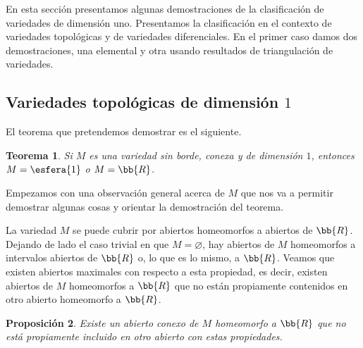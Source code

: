 \theoremstyle{plain}
\newtheorem{teoClasTop}{Teorema}[subsection]
\newtheorem{propoExisteUnAbiertoMaximalmenteHomeo}[teoClasTop]{Proposici\'{o}n}
\newtheorem{propoALoSumoDosComponentes}[teoClasTop]{Proposici\'{o}n}
\newtheorem{lemaEsSubintervaloExterno}[teoClasTop]{Lema}
\newtheorem{propoExtenderHomeoConIntervalo}[teoClasTop]{Proposici\'{o}n}
\newtheorem{teoClasTopConBorde}[teoClasTop]{Teorema}

\theoremstyle{remark}



En esta secci\'{o}n presentamos algunas demostraciones de la clasificaci\'{o}n
de variedades de dimensi\'{o}n uno. Presentamos la clasificaci\'{o}n
en el contexto de variedades topol\'{o}gicas y de variedades diferenciales.
En el primer caso damos dos demostraciones, una elemental y otra usando
resultados de triangulaci\'{o}n de variedades.

\subsection{Variedades topol\'{o}gicas de dimensi\'{o}n $1$}
El teorema que pretendemos demostrar es el siguiente.

\begin{teoClasTop}\label{thm:clastop}
	Si $M$ es una variedad sin borde, conexa y de dimensi\'{o}n $1$,
	entonces $M=\esfera{1}$ o $M=\bb{R}$.
\end{teoClasTop}

Empezamos con una observaci\'{o}n general acerca de $M$ que nos va a
permitir demostrar algunas cosas y orientar la demostraci\'{o}n del
teorema.

La variedad $M$ se puede cubrir por abiertos homeomorfos a abiertos de
$\bb{R}$. Dejando de lado el caso trivial en que $M=\varnothing$,
hay abiertos de $M$ homeomorfos a intervalos abiertos de $\bb{R}$ o,
lo que es lo mismo, a $\bb{R}$. Veamos que existen abiertos maximales con
respecto a esta propiedad, es decir, existen abiertos de $M$ homeomorfos
a $\bb{R}$ que no est\'{a}n propiamente contenidos en otro abierto homeomorfo
a $\bb{R}$.

\begin{propoExisteUnAbiertoMaximalmenteHomeo}%
	\label{thm:existeunabiertomaximalmentehomeo}
	Existe un abierto conexo de $M$ homeomorfo a $\bb{R}$ que
	no est\'{a} propiamente incluido en otro abierto con estas
	propiedades.
\end{propoExisteUnAbiertoMaximalmenteHomeo}

